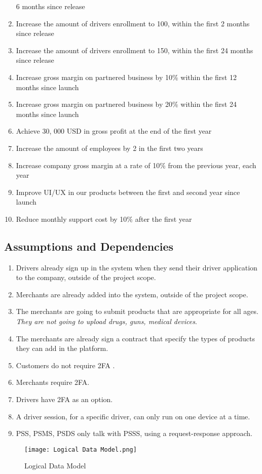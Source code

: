 \begin{enumerate}[label=BR-\arabic*]
    6 months since release
    \item Increase the amount of drivers enrollment to 100, within the first 
    2 months since release
    \pagebreak
    \item Increase the amount of drivers enrollment to 150, within the first 
    24 months since release
    \item Increase gross margin on partnered business by 10\% within the 
    first 12 months since launch
    \item Increase gross margin on partnered business by 20\% within the 
    first 24 months since launch
    \item Achieve 30, 000 USD in gross profit at the end of the first year
    \item Increase the amount of employees by 2 in the first two years
    \item Increase company gross margin at a rate of 10\% from the previous 
    year, each year
    \item Improve UI/UX in our products between the first and second year 
    since launch
    \item Reduce monthly support cost by 10\% after the first year
\end{enumerate}
\pagebreak 
\subsection{Assumptions and Dependencies}
\begin{enumerate}[label=AS-\arabic*]
    \item Drivers already sign up in the system when they send their 
    driver application to the company, outside of the project scope.
    \item Merchants are already added into the system, outside of the 
    project scope.
    \item The merchants are going to submit products that are appropriate for 
    all ages. \textit{They are not going to upload drugs, guns, 
    medical devices}.
    \item The merchants are already sign a contract that specify the types of 
    products they can add in the platform.
    \item Customers do not require 2FA \cite{2fa}.
    \item Merchants require 2FA.
    \item Drivers have 2FA as an option.
    \item A driver session, for a specific driver, can only run on one 
    device at a time.
    \item PSS, PSMS, PSDS only talk with PSSS, using a 
    request-response approach.
\end{enumerate}
\begin{figure}[!htb]
    \centering
    \texttt{[image: Logical Data Model.png]}
    \caption{Logical Data Model}
\end{figure}

